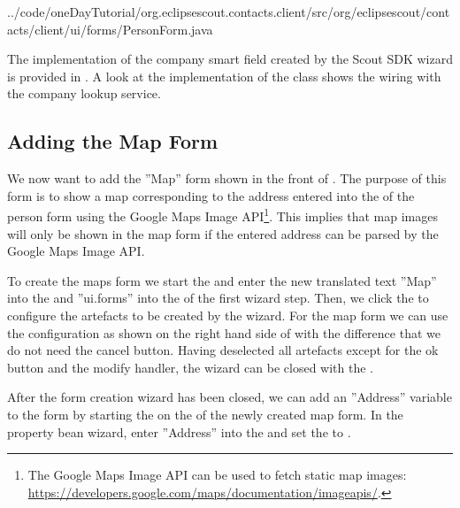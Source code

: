 \documentclass[a4paper,10pt,twoside]{book}
\begin{document}

{../code/oneDayTutorial/org.eclipsescout.contacts.client/src/org/eclipsescout/contacts/client/ui/forms/PersonForm.java}

The implementation of the company smart field created by the Scout SDK wizard is provided in . 
A look at the implementation of the  class shows the wiring with the company lookup service.

\subsection{Adding the Map Form}

We now want to add the ''Map'' form shown in the front of .
The purpose of this form is to show a map corresponding to the address entered into the  of the person form using the Google Maps Image API\footnote{
The Google Maps Image API can be used to fetch static map images: \url{https://developers.google.com/maps/documentation/imageapis/}.
}.
This implies that map images will only be shown in the map form if the entered address can be parsed by the Google Maps Image API. 

To create the maps form we start the  and enter the new translated text ''Map'' into the  and ''ui.forms'' into the  of the first wizard step. 
Then, we click the  to configure the artefacts to be created by the wizard. 
For the map form we can use the configuration as shown on the right hand side of  with the difference that we do not need the cancel button.
Having deselected all artefacts except for the ok button and the modify handler, the wizard can be closed with the .

After the form creation wizard has been closed, we can add an ''Address'' variable to the form by starting the  on the  of the newly created map form.
In the property bean wizard, enter ''Address'' into the  and set the  to . 
\end{document}

